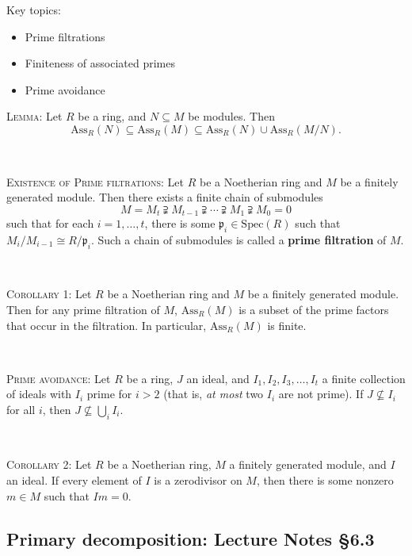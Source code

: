 \documentclass[12pt]{amsart}
\newcommand{\p}{\mathfrak{p}}
\newcommand{\Spec}{\mathrm{Spec}}
\newcommand{\Ass}{\mathrm{Ass}}
\newcommand{\0}{$\phantom{.}$}
\newcommand{\1}{\mathbbm{1}}
\begin{document}
  \begin{framed} Key topics:
\begin{itemize}
\item Prime filtrations
\item Finiteness of associated primes
\item Prime avoidance
\end{itemize}
\end{framed}





\noindent \textsc{Lemma:} Let $R$ be a ring, and $N\subseteq M$ be modules. Then
\[ \Ass_R(N) \subseteq \Ass_R(M) \subseteq \Ass_R(N) \cup \Ass_R(M/N).\]

\

\noindent \textsc{Existence of Prime filtrations:} Let $R$ be a Noetherian ring and $M$ be a finitely generated module. Then there exists a finite chain of submodules
\[ M= M_t \supsetneqq M_{t-1} \supsetneqq \cdots \supsetneqq M_{1} \supsetneqq M_0 = 0 \]
such that for each $i=1,\dots,t$, there is some $\p_i\in \Spec(R)$ such that $M_i / M_{i-1} \cong R/\p_i$.
Such a chain of submodules is called a \textbf{prime filtration} of $M$.

\

\noindent \textsc{Corollary 1:} Let $R$ be a Noetherian ring and $M$ be a finitely generated module. Then for any prime filtration of $M$, $\Ass_R(M)$ is a subset of the prime factors that occur in the filtration. In particular, $\Ass_R(M)$ is finite.

\

\noindent \textsc{Prime avoidance:} Let $R$ be a ring, $J$ an ideal, and $I_1,I_2,I_3,\dots,I_t$ a finite collection of ideals with $I_i$ prime for $i>2$ (that is, \emph{at most} two $I_i$ are not prime). If $J\not\subseteq I_i$ for all $i$, then $J \not\subseteq \bigcup_i I_i$.

\

\noindent \textsc{Corollary 2:} Let $R$ be a Noetherian ring, $M$ a finitely generated module, and $I$ an ideal. If every element of $I$ is a zerodivisor on $M$, then there is some nonzero $m\in M$ such that $Im=0$.



\newpage

\subsection{Primary decomposition: Lecture Notes \S6.3}\0
 
\end{document}
